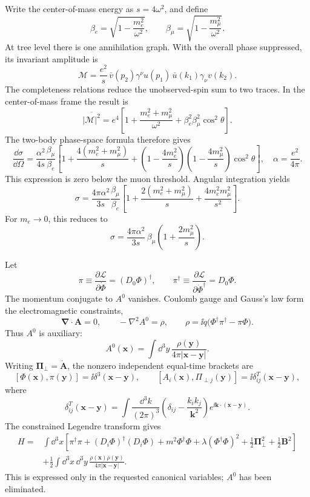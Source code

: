 \ExerciseEditorialNote

\begin{enumerate}
Write the center-of-mass energy as \(s=4\omega^2\), and define
\[
 \beta_e=\sqrt{1-\frac{m_e^2}{\omega^2}},
 \qquad
 \beta_\mu=\sqrt{1-\frac{m_\mu^2}{\omega^2}} .
\]
At tree level there is one annihilation graph.  With the overall phase
suppressed, its invariant amplitude is
\[
 \mathcal M=\frac{e^2}{s}\,
 \bar v(p_2)\gamma^\nu u(p_1)\,
 \bar u(k_1)\gamma_\nu v(k_2).
\]
The completeness relations reduce the unobserved-spin sum to two traces.
In the center-of-mass frame the result is
\[
 \overline{|\mathcal M|^2}
 =e^4\left[
  1+\frac{m_e^2+m_\mu^2}{\omega^2}
  +\beta_e^2\beta_\mu^2\cos^2\theta
 \right].
\]
The two-body phase-space formula therefore gives
\[
 \boxed{\;
 \frac{\dd\sigma}{\dd\Omega}
 =\frac{\alpha^2}{4s}\frac{\beta_\mu}{\beta_e}
 \left[
  1+\frac{4(m_e^2+m_\mu^2)}{s}
  +\left(1-\frac{4m_e^2}{s}\right)
   \left(1-\frac{4m_\mu^2}{s}\right)\cos^2\theta
 \right],\quad
 \alpha=\frac{e^2}{4\pi}.\;}
\]
This expression is zero below the muon threshold.  Angular integration
yields
\[
 \boxed{\;
 \sigma
 =\frac{4\pi\alpha^2}{3s}\frac{\beta_\mu}{\beta_e}
 \left[
  1+\frac{2(m_e^2+m_\mu^2)}{s}
  +\frac{4m_e^2m_\mu^2}{s^2}
 \right].\;}
\]
For \(m_e\to0\), this reduces to
\[
 \sigma=\frac{4\pi\alpha^2}{3s}\,
 \beta_\mu\left(1+\frac{2m_\mu^2}{s}\right).
\]

Let
\[
 \pi\equiv\frac{\partial\mathcal L}{\partial\dot\Phi}
 =(D_0\Phi)^\dagger,\qquad
 \pi^\dagger\equiv\frac{\partial\mathcal L}{\partial\dot\Phi^\dagger}
 =D_0\Phi .
\]
The momentum conjugate to \(A^0\) vanishes.  Coulomb gauge and Gauss's law
form the electromagnetic constraints,
\[
 \boldsymbol\nabla\cdot\mathbf A=0,\qquad
 -\nabla^2A^0=\rho,\qquad
 \rho=\ii q\bigl(\Phi^\dagger\pi^\dagger-\pi\Phi\bigr).
\]
Thus \(A^0\) is auxiliary:
\[
 A^0(\mathbf x)=\int \dd^3y\,
 \frac{\rho(\mathbf y)}{4\pi|\mathbf x-\mathbf y|}.
\]
Writing \(\boldsymbol\Pi_\perp=\dot{\mathbf A}\), the nonzero independent
equal-time brackets are
\[
 [\Phi(\mathbf x),\pi(\mathbf y)]=\ii\delta^3(\mathbf x-\mathbf y),
 \qquad
 [A_i(\mathbf x),\Pi_{\perp j}(\mathbf y)]
 =\ii\delta^{T}_{ij}(\mathbf x-\mathbf y),
\]
where
\[
 \delta^T_{ij}(\mathbf x-\mathbf y)
 =\int\frac{\dd^3k}{(2\pi)^3}
 \left(\delta_{ij}-\frac{k_i k_j}{\mathbf k^2}\right)
 e^{\ii\mathbf k\cdot(\mathbf x-\mathbf y)} .
\]
The constrained Legendre transform gives
\[
 \begin{split}
 H={}&\int \dd^3x\left[
  \pi^\dagger\pi+(D_i\Phi)^\dagger(D_i\Phi)
  +m^2\Phi^\dagger\Phi+\lambda(\Phi^\dagger\Phi)^2
  +\frac12\boldsymbol\Pi_\perp^2+\frac12\mathbf B^2
 \right]\\
 &+\frac12\int \dd^3x\,\dd^3y\,
 \frac{\rho(\mathbf x)\rho(\mathbf y)}
 {4\pi|\mathbf x-\mathbf y|}.
 \end{split}
\]
This is expressed only in the requested canonical variables; \(A^0\) has
been eliminated.


\end{enumerate}
